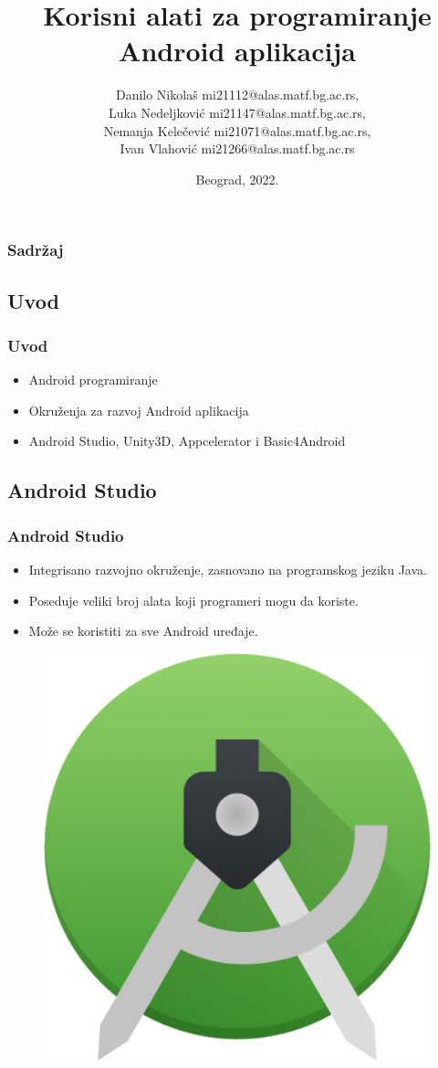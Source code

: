 \documentclass{beamer}
\title{Korisni alati za programiranje Android aplikacija}
\author{   Danilo Nikolaš mi21112@alas.matf.bg.ac.rs,
	\\ Luka Nedeljković mi21147@alas.matf.bg.ac.rs,
	\\ Nemanja Kelečević mi21071@alas.matf.bg.ac.rs,
	\\ Ivan Vlahović mi21266@alas.matf.bg.ac.rs}
\institute[]{Matematički fakultet, Univerzitet u Beogradu}
\date{
	\footnotesize{Beograd, 2022.}	
}
\begin{document}
\begin{frame}
	\titlepage
\end{frame}


\begin{frame}
	\frametitle{Sadržaj}
	\tableofcontents[hidesubsections] 
\end{frame}

\begin{frame}
    \section{Uvod}
    \frametitle{Uvod} 
    \begin{itemize}
	\item Android programiranje
	\item Okruženja za razvoj Android aplikacija
	\item Android Studio, Unity3D, Appcelerator i Basic4Android
   \end{itemize}
\end{frame}

\begin{frame}
    \section{Android Studio}
    \frametitle{Android Studio} 
    \begin{itemize}
	\item Integrisano razvojno okruženje, zasnovano na programskog jeziku Java.
	\item Poseduje veliki broj alata koji programeri mogu da koriste.
	\item  Može se koristiti za sve Android uređaje.
   \end{itemize}
   \begin{figure}[ht!]
    \centering
    \includegraphics[scale=0.10]{android_studio_logo.png}
\end{figure}
\end{frame}
\end{document}

